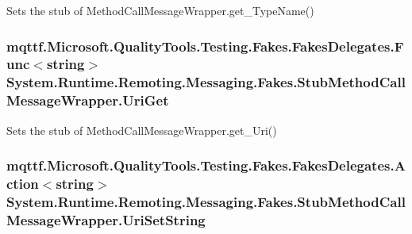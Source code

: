 Sets the stub of Method\-Call\-Message\-Wrapper.\-get\-\_\-\-Type\-Name()

\hypertarget{class_system_1_1_runtime_1_1_remoting_1_1_messaging_1_1_fakes_1_1_stub_method_call_message_wrapper_aaf6e3de6a55866adf306f401a9715730}{
\subsubsection[{Uri\-Get}]{\setlength{\rightskip}{0pt plus 5cm}mqttf.\-Microsoft.\-Quality\-Tools.\-Testing.\-Fakes.\-Fakes\-Delegates.\-Func$<$string$>$ System.\-Runtime.\-Remoting.\-Messaging.\-Fakes.\-Stub\-Method\-Call\-Message\-Wrapper.\-Uri\-Get}}\label{class_system_1_1_runtime_1_1_remoting_1_1_messaging_1_1_fakes_1_1_stub_method_call_message_wrapper_aaf6e3de6a55866adf306f401a9715730}


Sets the stub of Method\-Call\-Message\-Wrapper.\-get\-\_\-\-Uri()

\hypertarget{class_system_1_1_runtime_1_1_remoting_1_1_messaging_1_1_fakes_1_1_stub_method_call_message_wrapper_ab396a1a1143cffc37943d706680f15b0}{
\subsubsection[{Uri\-Set\-String}]{\setlength{\rightskip}{0pt plus 5cm}mqttf.\-Microsoft.\-Quality\-Tools.\-Testing.\-Fakes.\-Fakes\-Delegates.\-Action$<$string$>$ System.\-Runtime.\-Remoting.\-Messaging.\-Fakes.\-Stub\-Method\-Call\-Message\-Wrapper.\-Uri\-Set\-String}}\label{class_system_1_1_runtime_1_1_remoting_1_1_messaging_1_1_fakes_1_1_stub_method_call_message_wrapper_ab396a1a1143cffc37943d706680f15b0}


